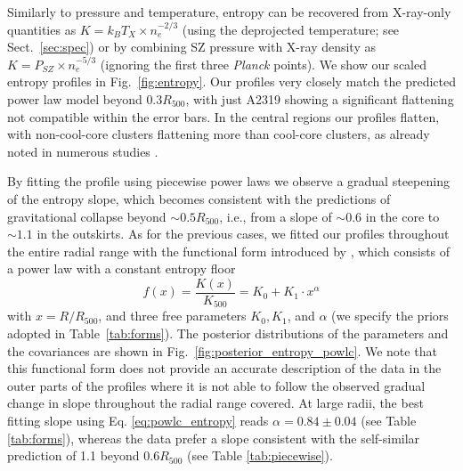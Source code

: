 \documentclass[traditabstract   ]{aa} %
\begin{document}
Similarly to pressure and temperature, entropy can be recovered from X-ray-only quantities as $K=k_BT_X\times n_{e}^{-2/3}$ { (using the deprojected temperature; see Sect.~\ref{sec:spec})} or by combining SZ pressure with X-ray density as $K=P_{SZ}\times n_{e}^{-5/3}$ (ignoring the first three \emph{Planck} points). We show our scaled entropy profiles in Fig.~\ref{fig:entropy}. Our profiles very closely match  the predicted power law model beyond $0.3 R_{500}$, with just A2319 showing a significant flattening not compatible within the error bars. In the central regions our profiles flatten, with non-cool-core clusters flattening more than cool-core clusters, as already noted in numerous studies \citep[e.g.,][and references therein]{pratt+10,cavagnolo+09}.

By fitting the profile using piecewise power laws we observe a gradual steepening of the entropy slope, which becomes consistent with the predictions of gravitational collapse \citep{voit+05} beyond $\sim0.5R_{500}$, i.e.,
from a slope of $\sim 0.6$ in the core to $\sim 1.1$ in the outskirts.
As for the previous cases, we fitted our profiles throughout the entire radial range with the functional form introduced by \citet{cavagnolo+09}, which consists of a power law with a constant entropy floor
\begin{equation}
f(x) = \frac{K(x)}{K_{500}} = K_{0} + K_{1} \cdot x^\alpha
\label{eq:powlc_entropy}
\end{equation}
with $x = R/R_{500}$, and three free parameters $K_0, K_1$, and $\alpha$ (we specify the priors adopted in Table~\ref{tab:forms}). The posterior distributions of the parameters and the covariances are shown in Fig.~\ref{fig:posterior_entropy_powlc}. We note that this functional form does not provide an accurate description of the data in the outer parts of the profiles where it is not able to follow the observed gradual change in slope throughout the radial range covered. At large radii, the best fitting slope using Eq. \ref{eq:powlc_entropy} reads $\alpha=0.84\pm0.04$ (see Table \ref{tab:forms}), whereas the data prefer a slope consistent with the self-similar prediction of 1.1 beyond $0.6R_{500}$ (see Table \ref{tab:piecewise}).
\end{document}
